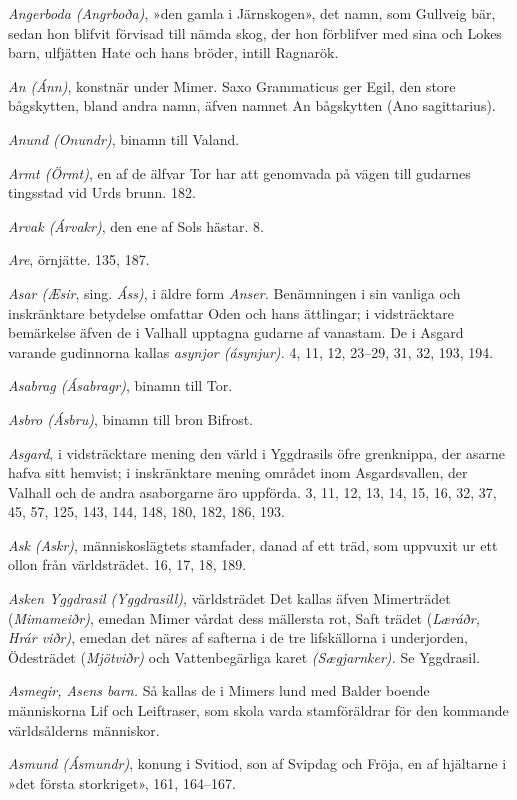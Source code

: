 \emph{Angerboda (Angrboða)}, »den gamla i Järnskogen», det namn, som
Gullveig bär, sedan hon blifvit förvisad till nämda skog, der hon
förblifver med sina och Lokes barn, ulfjätten Hate och hans bröder,
intill Ragnarök.

\emph{An (Ánn)}, konstnär under Mimer. Saxo Grammaticus ger Egil, den
store bågskytten, bland andra namn, äfven namnet An bågskytten (Ano
sagittarius).

\emph{Anund (Onundr)}, binamn till Valand.

\emph{Armt (Örmt)}, en af de älfvar Tor har att genomvada på vägen till
gudarnes tingsstad vid Urds brunn. 182.

\emph{Arvak (Árvakr)}, den ene af Sols hästar. 8.

\emph{Are}, örnjätte. 135, 187.

\emph{Asar (Æsir}, sing. \emph{Áss)}, i äldre form \emph{Anser.}
Benämningen i sin vanliga och inskränktare betydelse omfattar Oden och
hans ättlingar; i vidsträcktare bemärkelse äfven de i Valhall upptagna
gudarne af vanastam. De i Asgard varande gudinnorna kallas \emph{asynjor
(ásynjur).} 4, 11, 12, 23--29, 31, 32, 193, 194.

\emph{Asabrag (Ásabragr)}, binamn till Tor.

\emph{Asbro (Ásbru)}, binamn till bron Bifrost.

\emph{Asgard}, i vidsträcktare mening den värld i Yggdrasils öfre
grenknippa, der asarne hafva sitt hemvist; i inskränktare mening området
inom Asgardsvallen, der Valhall och de andra asaborgarne äro uppförda.
3, 11, 12, 13, 14, 15, 16, 32, 37, 45, 57, 125, 143, 144, 148, 180, 182,
186, 193.

\emph{Ask (Askr)}, människoslägtets stamfader, danad af ett träd, som
uppvuxit ur ett ollon från världsträdet. 16, 17, 18, 189.

\emph{Asken Yggdrasil (Yggdrasill)}, världsträdet Det kallas äfven
Mimerträdet (\emph{Mimameiðr)}, emedan Mimer vårdat dess mällersta rot,
Saft trädet (\emph{Læráðr, Hrár viðr)}, emedan det näres af safterna i
de tre lifskällorna i underjorden, Ödesträdet (\emph{Mjötviðr)} och
Vattenbegärliga karet \emph{(Sægjarnker).} Se Yggdrasil.

\emph{Asmegir, Asens barn.} Så kallas de i Mimers lund med Balder boende
människorna Lif och Leiftraser, som skola varda stamföräldrar för den
kommande världsålderns människor.

\emph{Asmund (Ásmundr)}, konung i Svitiod, son af Svipdag och Fröja, en
af hjältarne i »det första storkriget», 161, 164--167.

